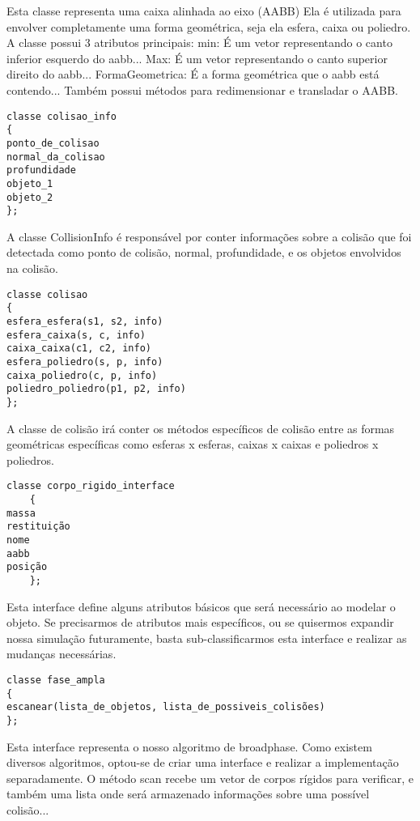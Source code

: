 Esta classe representa uma caixa alinhada ao eixo (AABB) Ela é utilizada para
envolver completamente uma forma geométrica, seja ela esfera, caixa ou
poliedro.
A classe possui 3 atributos principais:
min: É um vetor representando o canto inferior esquerdo do aabb...
Max: É um vetor representando o canto superior direito do aabb...
FormaGeometrica: É a forma geométrica que o aabb está contendo...
Também possui métodos para redimensionar e transladar o AABB.

\begin{lstlisting}[frame=single,caption=Código de exemplo\label{codigo1}]
classe colisao_info
{
ponto_de_colisao
normal_da_colisao
profundidade
objeto_1
objeto_2
};
\end{lstlisting}

A classe CollisionInfo é responsável por conter informações sobre a colisão que
foi detectada como ponto de colisão, normal, profundidade, e os objetos
envolvidos na colisão.

\begin{lstlisting}[frame=single,caption=Código de exemplo\label{codigo1}]
classe colisao
{
esfera_esfera(s1, s2, info)
esfera_caixa(s, c, info)
caixa_caixa(c1, c2, info)
esfera_poliedro(s, p, info)
caixa_poliedro(c, p, info)
poliedro_poliedro(p1, p2, info)
};
\end{lstlisting}

A classe de colisão irá conter os métodos específicos de colisão entre as
formas geométricas específicas como esferas x esferas, caixas x caixas e
poliedros x poliedros.

\begin{lstlisting}[frame=single,caption=Código de exemplo\label{codigo1}]
classe corpo_rigido_interface
    {
massa
restituição
nome
aabb
posição
    };
\end{lstlisting}

Esta interface define alguns atributos básicos que será necessário ao modelar o
objeto. Se precisarmos de atributos mais específicos, ou se quisermos expandir
nossa simulação futuramente, basta sub-classificarmos esta interface e realizar
as mudanças necessárias.

\begin{lstlisting}[frame=single,caption=Código de exemplo\label{codigo1}]
classe fase_ampla
{
escanear(lista_de_objetos, lista_de_possiveis_colisões)
};
\end{lstlisting}

Esta interface representa o nosso algoritmo de broadphase. Como existem
diversos algoritmos, optou-se de criar uma interface e realizar a implementação
separadamente.
O método scan recebe um vetor de corpos rígidos para verificar, e também uma
lista onde será armazenado informações sobre uma possível colisão...

